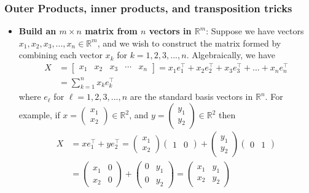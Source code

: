 \documentclass{report}
\begin{document}
    \pagebreak 
    \subsubsection{Outer Products, inner products, and transposition tricks}
    \begin{itemize}
        \item \textbf{Build an $m\times n$ matrix from $n$ vectors in $\mathbb{R}^{m}$}: Suppose we have vectors $x_{1}, x_{2}, x_{3}, ..., x_{n} \in \mathbb{R}^{m}$, and we wish to construct the matrix formed by combining each vector $x_{k}$ for $k=1,2,3,...,n$. Algebraically, we have
            \begin{align*}
                X &= \begin{bmatrix} x_{1} & x_{2} & x_{3} & \cdots & x_{n} \end{bmatrix} = x_{1}e_{1}^{\top} + x_{2}e_{2}^{\top} + x_{3}e_{3}^{\top} + ... + x_{n}e_{n}^{\top} \\
                  &= \sum_{k=1}^{n}x_{k}e_{k}^{\top}
            \end{align*}
            where $e_{\ell}$ for $\ell = 1,2,3,...,n$ are the standard basis vectors in $\mathbb{R}^{n} $.
            \bigbreak \noindent 
            For example, if $x = \begin{pmatrix} x_{1} \\ x_{2} \end{pmatrix} \in \mathbb{R}^{2}$, and $y = \begin{pmatrix} y_{1} \\ y_{2} \end{pmatrix} \in \mathbb{R}^{2}$ then
            \begin{align*}
                X &= xe_{1}^{\top} + ye_{2}^{\top} = \begin{pmatrix} x_{1} \\ x_{2} \end{pmatrix} \begin{pmatrix} 1  & 0 \end{pmatrix} + \begin{pmatrix} y_{1} \\ y_{2} \end{pmatrix} \begin{pmatrix} 0 & 1 \end{pmatrix} \\
                  &= \begin{pmatrix} x_{1} & 0 \\ x_{2} & 0 \end{pmatrix} + \begin{pmatrix} 0& y_{1} \\ 0 & y_{2} \end{pmatrix} = \begin{pmatrix} x_{1} & y_{1} \\ x_{2} & y_{2} \end{pmatrix}

\end{align*}
\end{itemize}
\end{document}
